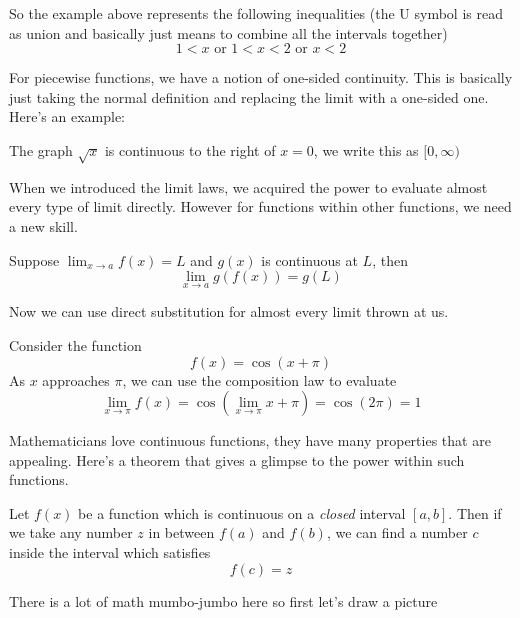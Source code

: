 So the example above represents the following inequalities (the U symbol is read as union and basically just means to combine all the intervals together)
\[ 1 < x \text { or } 1 < x < 2 \text{ or } x < 2 \]

For piecewise functions, we have a notion of one-sided continuity. This is basically just taking the normal definition and replacing the limit with a one-sided one. Here's an example:

\begin{example}
	The graph $\sqrt{x}$ is continuous to the right of $x = 0$, we write this as $[0, \infty)$ 
\end{example}

When we introduced the limit laws, we acquired the power to evaluate almost every type of limit directly. However for functions within other functions, we need a new skill. 

\begin{theorem}
 	Suppose $\lim_{x \to a} f(x) = L$ and $g(x)$ is continuous at $L$, then
 	\[ \lim_{x \to a} g(f(x)) = g(L) \]
\end{theorem} 

Now we can use direct substitution for almost every limit thrown at us. 

\begin{example}
	Consider the function
	\[ f(x) = \cos(x + \pi) \]
	As $x$ approaches $\pi$, we can use the composition law to evaluate
	\[ \lim_{x \to \pi} f(x) = \cos(\lim_{x \to \pi} x + \pi) = \cos(2\pi) = 1 \]
\end{example}

\newpage 
Mathematicians love continuous functions, they have many properties that are appealing. Here's a theorem that gives a glimpse to the power within such functions.

\begin{theorem}
	Let $f(x)$ be a function which is continuous on a \emph{closed} interval $[a,b]$. Then if we take any number $z$ in between $f(a)$ and $f(b)$, we can find a number $c$ inside the interval which satisfies
	\[ f(c) = z \]
\end{theorem}

There is a lot of math mumbo-jumbo here so first let's draw a picture


